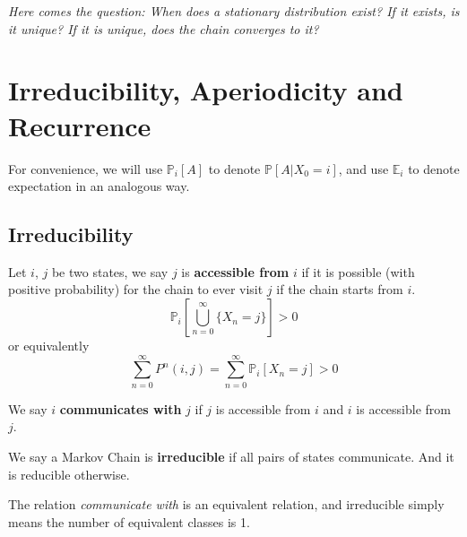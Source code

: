 \emph{Here comes the question: When does a stationary distribution exist? If it exists, is it unique? If it is unique, does the chain converges to it?}

\section{Irreducibility, Aperiodicity and Recurrence}
For convenience, we will use $\mathbb{P}_i[A]$ to denote $\mathbb{P}[A | X_0 = i]$, and use $\mathbb{E}_i$ to denote expectation in an analogous way.

\subsection{Irreducibility}
\begin{definition}[Accessibility]
    Let $i$, $j$ be two states, we say $j$ is \textbf{accessible from} $i$ if it is possible (with positive probability) for the chain to ever visit $j$ if the chain starts from $i$.
    \[ \mathbb{P}_i[\bigcup_{n=0}^\infty\{X_n = j\}] > 0 \]
    or equivalently
    \[ \sum_{n=0}^\infty P^n(i,j) = \sum_{n=0}^\infty \mathbb{P}_i[X_n = j] > 0 \]
\end{definition}
\begin{definition}[Communication]
    We say $i$ \textbf{communicates with} $j$ if $j$ is accessible from $i$ and $i$ is accessible from $j$.
\end{definition}
\begin{definition}[Irreducibility]
    We say a Markov Chain is \textbf{irreducible} if all pairs of states communicate. And it is reducible otherwise.
\end{definition}
The relation \emph{communicate with} is an equivalent relation, and irreducible simply means the number of equivalent classes is 1.

